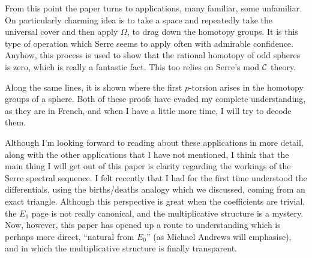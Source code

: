 \documentclass[11pt]{article}
\begin{document}
\begin{SerreHomSingFibSpace}
From this point the paper turns to applications, many familiar, some unfamiliar. On particularly charming idea is to take a space and repeatedly take the universal cover and then apply $\Omega$, to drag down the homotopy groups. It is this type of operation which Serre seems to apply often with admirable confidence. Anyhow, this process is used to show that the rational homotopy of odd spheres is zero, which is really a fantastic fact. This too relies on Serre's mod $\mathcal{C}$ theory.

Along the same lines, it is shown where the first $p$-torsion arises in the homotopy groups of a sphere. Both of these proofs have evaded my complete understanding, as they are in French, and when I have a little more time, I will try to decode them.

Although I'm looking forward to reading about these applications in more detail, along with the other applications that I have not mentioned, I think that the main thing I will get out of this paper is clarity regarding the workings of the Serre spectral sequence. I felt recently that I had for the first time understood the differentials, using the births/deaths analogy which we discussed, coming from an exact triangle. Although this perspective is great when the coefficients are trivial, the $E_1$ page is not really canonical, and the multiplicative structure is a mystery. Now, however, this paper has opened up a route to understanding which is perhaps more direct, ``natural from $E_0$'' (as Michael Andrews will emphasise), and in which the multiplicative structure is finally transparent.

\pagebreak
\end{SerreHomSingFibSpace}
\end{document}

